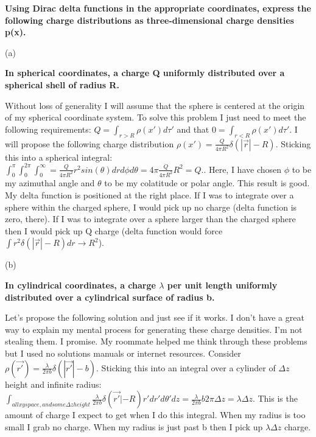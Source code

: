 \begin{homeworkProblem}

\textbf{Using Dirac delta functions in the appropriate coordinates, express the following 
charge distributions as three-dimensional charge densities p(x). }

\begin{homeworkSection}{(a)} 

\textbf{In spherical coordinates, a charge Q uniformly distributed over a spherical 
shell of radius R. }

Without loss of generality I will assume that the sphere is centered at the origin of my spherical coordinate system. To solve this problem I just need to meet the following requirements: $Q = \int_{r>R} \rho(x')d\tau'$ and that $0 = \int_{r<R} \rho(x')d\tau '$. I will propose the following charge distribution $\rho(x') = \frac{Q}{4\pi R^2} \delta(|\vec{r}|-R)$. Sticking this into a spherical integral: $\int_0^\pi \int_0^{2\pi} \int_0^\infty = \frac{Q}{4\pi R^2} r^2 sin(\theta) dr d\phi d\theta = 4\pi \frac{Q}{4\pi R^2}R^2 = Q.$. Here, I have chosen $\phi$ to be my azimuthal angle and $\theta$ to be my colatitude or polar angle. This result is good. My delta function is positioned at the right place.  If I was to integrate over a sphere within the charged sphere, I would pick up no charge (delta function is zero, there). If I was to integrate over a sphere larger than the charged sphere then I would pick up Q charge (delta function would force $\int r^2 \delta(|\vec{r}|-R) dr \rightarrow R^2$).

\end{homeworkSection}

\begin{homeworkSection}{(b)}

\textbf{In cylindrical coordinates, a charge $\lambda$ per unit length uniformly distributed 
over a cylindrical surface of radius b. }

Let's propose the following solution and just see if it works. I don't have a great way to explain my mental process for generating these charge densities. I'm not stealing them. I promise. My roommate helped me think through these problems but I used no solutions manuals or internet resources. Consider $\rho(\vec{r'}) = \frac{\lambda}{2\pi b} \delta(|\vec{r'}|-b)$. Sticking this into an integral over a cylinder of $\Delta z$ height and infinite radius: $\int_{all xy space, and some \Delta z height} \frac{\lambda}{2\pi b} \delta(\vec{r'}|-R) r' dr' d\theta' dz = \frac{\lambda}{2\pi b} b 2\pi \Delta z = \lambda \Delta z$. This is the amount of charge I expect to get when I do this integral. When my radius is too small I grab no charge. When my radius is just past b then I pick up $\lambda \Delta z$ charge.


\end{homeworkSection}
\end{homeworkProblem}
